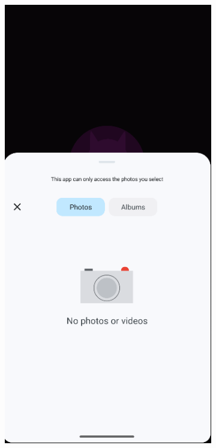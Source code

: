 \documentclass{report}
\begin{document}
\begin{figure}[h]
    \vspace{1em}

    \centering
    \begin{subfigure}[b]{0.32\textwidth}
        \includegraphics[width=\textwidth]{DEMO_RegSelect.png} 

\end{subfigure}
\end{figure}
\end{document}
